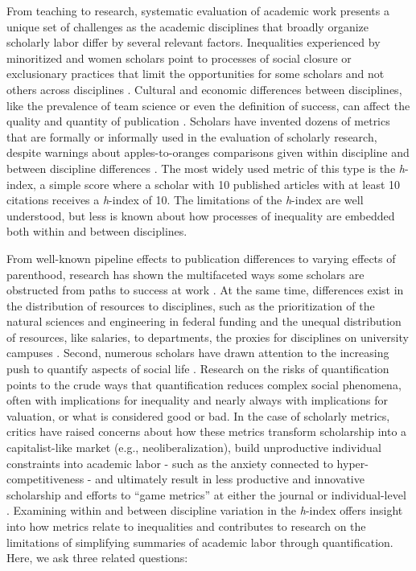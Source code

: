 \documentclass[
  10pt,
  letterpaper,
]{article}
\begin{document}
From teaching to research, systematic evaluation of academic work
presents a unique set of challenges as the academic disciplines that
broadly organize scholarly labor differ by several relevant factors.
Inequalities experienced by minoritized and women scholars point to
processes of social closure or exclusionary practices that limit the
opportunities for some scholars and not others across disciplines
\citep{hofstra_diversity_2020, lariviere_bibliometrics_2013, xie_sex_1998}.
Cultural and economic differences between disciplines, like the
prevalence of team science or even the definition of success, can affect
the quality and quantity of publication
\citep{fortunato_science_2018, gardner_conceptualizing_2009, stephan_how_2012}.
Scholars have invented dozens of metrics that are formally or informally
used in the evaluation of scholarly research, despite warnings about
apples-to-oranges comparisons given within discipline and between
discipline differences
\citep{hicks_bibliometrics_2015, ioannidis_standardized_2019}. The most
widely used metric of this type is the \emph{h}-index, a simple score
where a scholar with 10 published articles with at least 10 citations
receives a \emph{h}-index of 10. The limitations of the \emph{h}-index
are well understood, but less is known about how processes of inequality
are embedded both within and between disciplines.

From well-known pipeline effects to publication differences to varying
effects of parenthood, research has shown the multifaceted ways some
scholars are obstructed from paths to success at work
\citep{fox_gender_2005, fox_gender_2017, grant_revisiting_2000, long_scientific_1995, morgan_unequal_2021}.
At the same time, differences exist in the distribution of resources to
disciplines, such as the prioritization of the natural sciences and
engineering in federal funding and the unequal distribution of
resources, like salaries, to departments, the proxies for disciplines on
university campuses \citep{katz_metrics_2020}. Second, numerous scholars
have drawn attention to the increasing push to quantify aspects of
social life \citep{mennicken_what_2019}. Research on the risks of
quantification points to the crude ways that quantification reduces
complex social phenomena, often with implications for inequality and
nearly always with implications for valuation, or what is considered
good or bad. In the case of scholarly metrics, critics have raised
concerns about how these metrics transform scholarship into a
capitalist-like market (e.g., neoliberalization), build unproductive
individual constraints into academic labor - such as the anxiety
connected to hyper-competitiveness - and ultimately result in less
productive and innovative scholarship
\citep{edwards_academic_2017, muller_tyranny_2019} and efforts to ``game
metrics'' at either the journal or individual-level
\citep{siler_who_2022}. Examining within and between discipline
variation in the \emph{h}-index offers insight into how metrics relate
to inequalities and contributes to research on the limitations of
simplifying summaries of academic labor through quantification. Here, we
ask three related questions:
\end{document}
